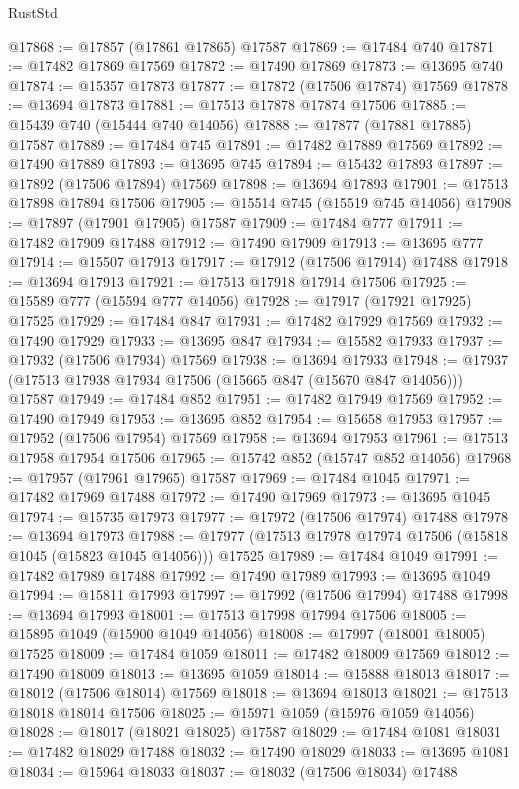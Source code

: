 \begin{lexlean}{RustStd}
\begin{coremodule}
@17868 := @17857 (@17861 @17865) @17587
@17869 := @17484 @740
@17871 := @17482 @17869 @17569
@17872 := @17490 @17869
@17873 := @13695 @740
@17874 := @15357 @17873
@17877 := @17872 (@17506 @17874) @17569
@17878 := @13694 @17873
@17881 := @17513 @17878 @17874 @17506
@17885 := @15439 @740 (@15444 @740 @14056)
@17888 := @17877 (@17881 @17885) @17587
@17889 := @17484 @745
@17891 := @17482 @17889 @17569
@17892 := @17490 @17889
@17893 := @13695 @745
@17894 := @15432 @17893
@17897 := @17892 (@17506 @17894) @17569
@17898 := @13694 @17893
@17901 := @17513 @17898 @17894 @17506
@17905 := @15514 @745 (@15519 @745 @14056)
@17908 := @17897 (@17901 @17905) @17587
@17909 := @17484 @777
@17911 := @17482 @17909 @17488
@17912 := @17490 @17909
@17913 := @13695 @777
@17914 := @15507 @17913
@17917 := @17912 (@17506 @17914) @17488
@17918 := @13694 @17913
@17921 := @17513 @17918 @17914 @17506
@17925 := @15589 @777 (@15594 @777 @14056)
@17928 := @17917 (@17921 @17925) @17525
@17929 := @17484 @847
@17931 := @17482 @17929 @17569
@17932 := @17490 @17929
@17933 := @13695 @847
@17934 := @15582 @17933
@17937 := @17932 (@17506 @17934) @17569
@17938 := @13694 @17933
@17948 := @17937 (@17513 @17938 @17934 @17506 (@15665 @847 (@15670 @847 @14056))) @17587
@17949 := @17484 @852
@17951 := @17482 @17949 @17569
@17952 := @17490 @17949
@17953 := @13695 @852
@17954 := @15658 @17953
@17957 := @17952 (@17506 @17954) @17569
@17958 := @13694 @17953
@17961 := @17513 @17958 @17954 @17506
@17965 := @15742 @852 (@15747 @852 @14056)
@17968 := @17957 (@17961 @17965) @17587
@17969 := @17484 @1045
@17971 := @17482 @17969 @17488
@17972 := @17490 @17969
@17973 := @13695 @1045
@17974 := @15735 @17973
@17977 := @17972 (@17506 @17974) @17488
@17978 := @13694 @17973
@17988 := @17977 (@17513 @17978 @17974 @17506 (@15818 @1045 (@15823 @1045 @14056))) @17525
@17989 := @17484 @1049
@17991 := @17482 @17989 @17488
@17992 := @17490 @17989
@17993 := @13695 @1049
@17994 := @15811 @17993
@17997 := @17992 (@17506 @17994) @17488
@17998 := @13694 @17993
@18001 := @17513 @17998 @17994 @17506
@18005 := @15895 @1049 (@15900 @1049 @14056)
@18008 := @17997 (@18001 @18005) @17525
@18009 := @17484 @1059
@18011 := @17482 @18009 @17569
@18012 := @17490 @18009
@18013 := @13695 @1059
@18014 := @15888 @18013
@18017 := @18012 (@17506 @18014) @17569
@18018 := @13694 @18013
@18021 := @17513 @18018 @18014 @17506
@18025 := @15971 @1059 (@15976 @1059 @14056)
@18028 := @18017 (@18021 @18025) @17587
@18029 := @17484 @1081
@18031 := @17482 @18029 @17488
@18032 := @17490 @18029
@18033 := @13695 @1081
@18034 := @15964 @18033
@18037 := @18032 (@17506 @18034) @17488

\end{coremodule}
\end{lexlean}
